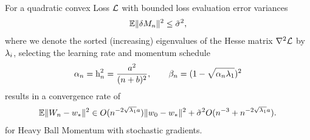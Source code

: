 \begin{theorem}
	For a quadratic convex Loss \(\mathcal{L}\) with bounded
	loss evaluation error variances
	\begin{align*}
		\mathbb{E}\|\delta M_n\|^2 \le \tilde{\sigma}^2,
	\end{align*} 
	where we denote the sorted (increasing) eigenvalues of the Hesse matrix
	\(\nabla^2\mathcal{L}\) by \(\lambda_i\),
	selecting the learning rate and momentum schedule
	\begin{align*}
		\alpha_n = \text{h}_n^2 = \frac{a^2}{(n+b)^2}, \qquad \beta_n=(1-\sqrt{\alpha_n\lambda_1})^2
	\end{align*}
	results in a convergence rate of
	\begin{align*}
		\mathbb{E}\|W_n -w_*\|^2 \in O(n^{-2\sqrt{\lambda_1}a})\|w_0 - w_*\|^2
		+ \tilde{\sigma}^2 O(n^{-3}+n^{-2\sqrt{\lambda_1} a}).
	\end{align*}
	for Heavy Ball Momentum with stochastic gradients.
\end{theorem}
